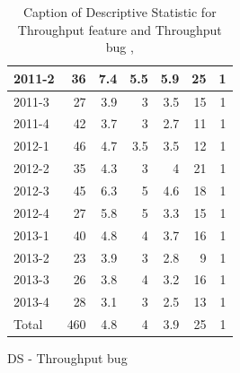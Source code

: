 \documentclass[UKenglish]{ifimaster}  %
\begin{document}
\begin{appendices}
\begin{table}[!htbp]
\begin{adjustwidth}{-2.5cm}{}
\begin{subfigure}[b]{0.3\textwidth}
{\begin{tabular}{ | l | r | r | r | r | r | r | }
 2011-2  & 36 & 7.4 & 5.5 & 5.9 & 25 & 1 \\ \hline
 2011-3  & 27 & 3.9 & 3 & 3.5 & 15 & 1 \\ \hline
 2011-4  & 42 & 3.7 & 3 & 2.7 & 11 & 1 \\ \hline
 2012-1  & 46 & 4.7 & 3.5 & 3.5 & 12 & 1 \\ \hline
 2012-2  & 35 & 4.3 & 3 & 4 & 21 & 1 \\ \hline
 2012-3  & 45 & 6.3 & 5 & 4.6 & 18 & 1 \\ \hline
 2012-4  & 27 & 5.8 & 5 & 3.3 & 15 & 1 \\ \hline
 2013-1  & 40 & 4.8 & 4 & 3.7 & 16 & 1 \\ \hline
 2013-2  & 23 & 3.9 & 3 & 2.8 & 9 & 1 \\ \hline
 2013-3  & 26 & 3.8 & 4 & 3.2 & 16 & 1 \\ \hline
 2013-4  & 28 & 3.1 & 3 & 2.5 & 13 & 1 \\ \hline
 Total  & 460 & 4.8 & 4 & 3.9 & 25 & 1 \\ \hline
\end{tabular}
}
\caption{DS - Throughput bug}
 \label{DS:TPB:2}
\end{subfigure}
\end{adjustwidth}
\caption[Optional caption for list of figures]{Caption of Descriptive Statistic for Throughput feature and Throughput bug  , }
\label{DS:2:2}
\end{table}





\end{appendices}
\end{document}
